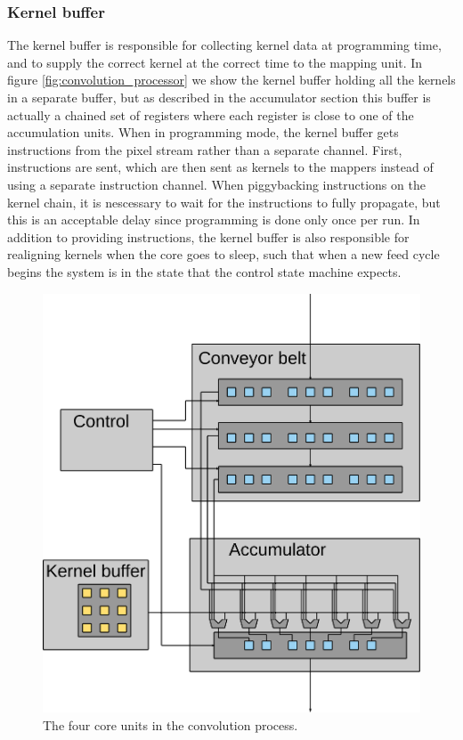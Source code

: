 \subsubsection{Kernel buffer}
The kernel buffer is responsible for collecting kernel data at programming time, and to supply the correct kernel at the correct time to the mapping unit.
In figure \ref{fig:convolution_processor} we show the kernel buffer holding all the kernels in a separate buffer, but as described in the accumulator section this buffer is actually a chained set of registers where each register is close to one of the accumulation units.
When in programming mode, the kernel buffer gets instructions from the pixel stream rather than a separate channel.
First, instructions are sent, which are then sent as kernels to the mappers instead of using a separate instruction channel.
When piggybacking instructions on the kernel chain, it is nescessary to wait for the instructions to fully propagate, but this is an acceptable delay since programming is done only once per run.
In addition to providing instructions, the kernel buffer is also responsible for realigning kernels when the core goes to sleep, such that when a new feed cycle begins the system is in the state that the control state machine expects.


\begin{figure}[h!]
    \includegraphics[width=\linewidth]{img/processor_overview_small.png}
    \caption{The four core units in the convolution process.}
    \label{fig:processor_core}
\end{figure}

